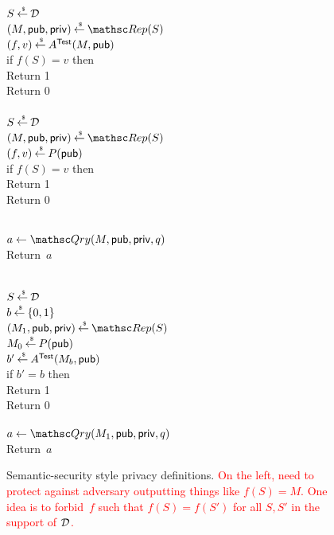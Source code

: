 %
\begin{figure}[htbp]
\centering
{}
{
{

\\
$S\getsr \distr{}{}$\\
$(M,\pubaux,\privaux) \getsr \Rep(S)$\\
$(f,v) \getsr A^{\TestOracle}(M,\pubaux)$\\
if $f(S)=v$ then\\
\nudge Return 1\\
Return 0\\

\medskip
{}\\
$S\getsr \distr{}{}$\\
$(M,\pubaux,\privaux) \getsr \Rep(S)$\\
$(f,v) \getsr P(\pubaux)$\\
if $f(S)=v$ then\\
\nudge Return 1\\
Return 0\\
}
%
{
\\
$a \gets \Qry(M,\pubaux,\privaux,q)$\\
Return~$a$\\
}
}
{
{
\\
$S\getsr \distr{}{}$\\
$b \getsr \bits$\\
$(M_1,\pubaux,\privaux) \getsr \Rep(S)$\\
$M_0 \getsr P(\pubaux)$\\
$b' \getsr A^{\TestOracle}(M_b,\pubaux)$\\
if $b'=b$ then\\
\nudge Return 1\\
Return 0\\
%
}
%
{
\\
$a \gets \Qry(M_1,\pubaux,\privaux,q)$\\
Return~$a$\\
}
}
\caption{Semantic-security style privacy
  definitions. \textcolor{red}{On the left, need to protect against
    adversary outputting
    things like $f(S)=M$.  One idea is to forbid~$f$ such that
    $f(S)=f(S')$ for all $S,S'$ in the support of $\distr{}{}$.}
    } 
\label{fig:privacy-ss}
\end{figure}

